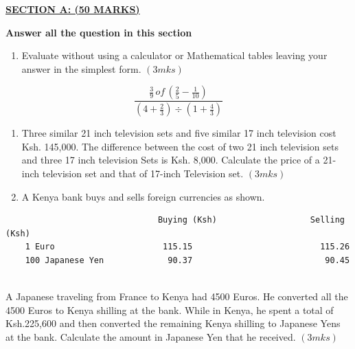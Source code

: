 \documentclass[
  a4paperpaper,
]{scrbook}
\providecommand{\tightlist}{%
  \setlength{\itemsep}{0pt}\setlength{\parskip}{0pt}}\usepackage{longtable,booktabs,array}
\begin{document}
\begin{tcolorbox}[enhanced jigsaw, left=2mm, colframe=quarto-callout-note-color-frame, toptitle=1mm, opacitybacktitle=0.6, rightrule=.15mm, colbacktitle=quarto-callout-note-color!10!white, colback=white, arc=.35mm, breakable, leftrule=.75mm, bottomtitle=1mm, bottomrule=.15mm, title=\textcolor{quarto-callout-note-color}{\faInfo}\hspace{0.5em}{Model Sample Paper 4}, titlerule=0mm, coltitle=black, toprule=.15mm, opacityback=0]

\ul{\textbf{SECTION A: (50 MARKS)}}

\textbf{Answer all the question in this section}

\begin{enumerate}
\def\labelenumi{\arabic{enumi}.}
\tightlist
\item
  Evaluate without using a calculator or Mathematical tables leaving
  your answer in the simplest form. \((3mks)\)
\end{enumerate}

\[ \frac{\frac{3}{9}\,of\,\left(\frac{2}{5}-\frac{1}{10}\right)}{\left(4+\frac{2}{3}\right)\div\left(1+\frac{4}{3}\right)}\]

\begin{enumerate}
\def\labelenumi{\arabic{enumi}.}
\setcounter{enumi}{1}
\item
  Three similar 21 inch television sets and five similar 17 inch
  television cost Ksh. 145,000. The difference between the cost of two
  21 inch television sets and three 17 inch television Sets is Ksh.
  8,000. Calculate the price of a 21- inch television set and that of
  17-inch Television set. \((3mks)\)
\item
  A Kenya bank buys and sells foreign currencies as shown.
\end{enumerate}

\begin{verbatim}
                               Buying (Ksh)                   Selling (Ksh)
    1 Euro                      115.15                          115.26
    100 Japanese Yen             90.37                           90.45
    
\end{verbatim}

A Japanese traveling from France to Kenya had 4500 Euros. He converted
all the 4500 Euros to Kenya shilling at the bank. While in Kenya, he
spent a total of Ksh.225,600 and then converted the remaining Kenya
shilling to Japanese Yens at the bank. Calculate the amount in Japanese
Yen that he received. \((3mks)\)


\end{tcolorbox}
\end{document}
